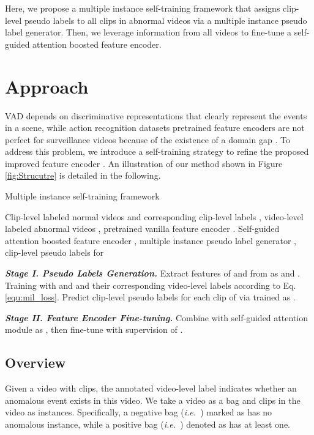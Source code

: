 \documentclass[final]{cvpr}
\newcommand{\ftnd}{\textcolor[rgb]{0.,0,0}}
\newcommand{\jcst}{\textcolor[rgb]{0,0,0}}
\newcommand{\jcnd}{\textcolor[rgb]{0,0.,0}}
\renewcommand{\ie}{\textit{i.e.\ }}
\begin{document}
\jcst{Here, we propose a multiple instance self-training framework that assigns clip-level pseudo labels to all clips in abnormal videos via a multiple instance pseudo label generator. Then, we leverage information from all videos to fine-tune a self-guided attention boosted feature encoder. }




\section{Approach}
VAD depends on discriminative representations that clearly represent the events in a scene, while action recognition datasets pretrained feature encoders are not perfect for surveillance videos because of the existence of a domain gap \cite{liu2019exploring,choi2019can,choi2020unsupervised}.
To address this problem, we introduce a self-training strategy to refine the \ftnd{proposed improved} feature encoder . An illustration of our method shown in Figure \ref{fig:Strucutre} is detailed in the following.
\begin{algorithm}[t] 
 \small
 \caption{\jcnd{Multiple instance self-training framework}}
 \label{alg:framework}
 \begin{algorithmic}[1]
    \REQUIRE Clip-level labeled normal videos  and corresponding clip-level labels , video-level labeled abnormal videos , pretrained vanilla feature encoder .
    \ENSURE Self-guided attention boosted feature encoder , multiple instance pseudo label generator ,  clip-level pseudo labels  for 
    
    \noindent\jcst{\textbf{\textit{Stage I. Pseudo Labels Generation.}}}
    \STATE Extract features of  and  from  as  and .
    \STATE Training  with  and  and their corresponding video-level labels according to Eq. \ref{equ:mil_loss}.
    \STATE Predict clip-level pseudo labels for each clip of  via trained  as .
    
    \noindent\jcst{\textbf{\textit{Stage II. Feature Encoder Fine-tuning.}}}
    \STATE Combine  with self-guided attention module as , then fine-tune  with supervision of .
  \end{algorithmic}
\end{algorithm}
\vspace{-0.2cm}
\subsection{Overview}
\vspace{-0.2cm}
Given a video  with  clips, the annotated video-level label  indicates whether an anomalous event exists in this video. 
We take a video  as a bag and clips  in the video as instances. Specifically, a negative bag (\ie ) marked as  has no anomalous instance, while a positive bag (\ie ) denoted as  has at least one. 
\end{document}
